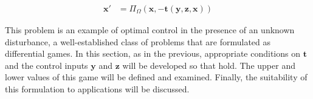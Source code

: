\begin{align}
    \mathbf{x}' &= \Pi_{\Omega} (\mathbf{x}, -\mathbf{t}(\mathbf{y}, \mathbf{z}, \mathbf{x}))\label{eqn:two-player-dynamics}
\end{align}

This problem is an example of optimal control in the presence of an unknown disturbance, a well-established class of problems that are formulated as differential games. \citep{bardi2008optimal}
In this section, as in the previous, appropriate conditions on $\mathbf{t}$ and the control inputs $\mathbf{y}$ and $\mathbf{z}$ will be developed so that  hold.
The upper and lower values of this game will be defined and examined.
Finally, the suitability of this formulation to applications will be discussed.
